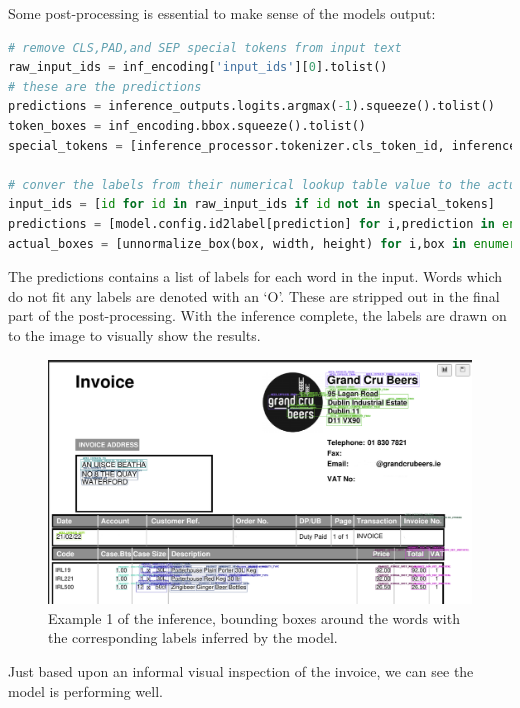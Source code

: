 Some post-processing is essential to make sense of the models output:
\begin{lstlisting}[language=python, caption={Inference Output Post-processing.}, label=infer_out_post_processing]
# remove CLS,PAD,and SEP special tokens from input text
raw_input_ids = inf_encoding['input_ids'][0].tolist()
# these are the predictions
predictions = inference_outputs.logits.argmax(-1).squeeze().tolist()
token_boxes = inf_encoding.bbox.squeeze().tolist()
special_tokens = [inference_processor.tokenizer.cls_token_id, inference_processor.tokenizer.sep_token_id, inference_processor.tokenizer.pad_token_id]

# conver the labels from their numerical lookup table value to the actual word
input_ids = [id for id in raw_input_ids if id not in special_tokens]
predictions = [model.config.id2label[prediction] for i,prediction in enumerate(predictions) if not (raw_input_ids[i] in special_tokens)]
actual_boxes = [unnormalize_box(box, width, height) for i,box in enumerate(token_boxes) if not (raw_input_ids[i] in special_tokens )]
\end{lstlisting}
The predictions contains a list of labels for each word in the input. Words which do not fit any labels are denoted with an `O'. These
are stripped out in the final part of the post-processing. 
With the inference complete, the labels are drawn on to the image to visually show the results.
\begin{figure}[H]
	\centering
	\includegraphics[width=1\textwidth]{figures/inf_example_top.png}
	\caption{Example 1 of the inference, bounding boxes around the words with the corresponding labels inferred by the model.}
	\label{fig:inference_output_top}
\end{figure}
Just based upon an informal visual inspection of the invoice, we can see the model is performing well.
